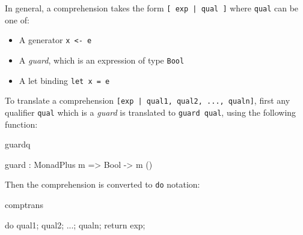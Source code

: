 \noindent
In general, a comprehension takes the form \texttt{[ exp | qual ]} where
\texttt{qual} can be one of:

\begin{itemize}
\item A generator \texttt{x <- e}
\item A \emph{guard}, which is an expression of type \texttt{Bool}
\item A let binding \texttt{let x = e}
\end{itemize}

\noindent
To translate a comprehension \texttt{[exp | qual1, qual2, ..., qualn]}, first
any qualifier
\texttt{qual} which is a \emph{guard} is translated to \texttt{guard qual}, using
the following function:

\begin{SaveVerbatim}{guardq}

guard : MonadPlus m => Bool -> m ()

\end{SaveVerbatim}

\noindent
Then the comprehension is converted to \texttt{do} notation:

\begin{SaveVerbatim}{comptrans}

do { qual1; qual2; ...; qualn; return exp; }

\end{SaveVerbatim}



